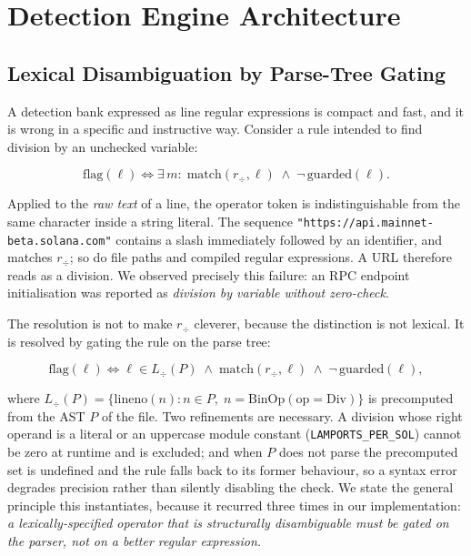 \section{Detection Engine Architecture}
\label{sec:engine}

\subsection{Lexical Disambiguation by Parse-Tree Gating}

A detection bank expressed as line regular expressions is compact and fast,
and it is wrong in a specific and instructive way. Consider a rule intended to
find division by an unchecked variable:

\begin{equation}
\mathrm{flag}(\ell) \iff \exists\, m:\; \mathrm{match}(r_{\div}, \ell)
\;\wedge\; \neg\,\mathrm{guarded}(\ell).
\label{eq:rawflag}
\end{equation}

Applied to the \emph{raw text} of a line, the operator token is
indistinguishable from the same character inside a string literal. The
sequence \texttt{"https://api.mainnet-beta.solana.com"} contains a slash
immediately followed by an identifier, and matches $r_{\div}$; so do file paths
and compiled regular expressions. A URL therefore reads as a division. We
observed precisely this failure: an RPC endpoint initialisation was reported as
\emph{division by variable without zero-check}.

The resolution is not to make $r_{\div}$ cleverer, because the distinction is
not lexical. It is resolved by gating the rule on the parse tree:

\begin{equation}
\mathrm{flag}(\ell) \iff \ell \in L_{\div}(P) \;\wedge\;
\mathrm{match}(r_{\div},\ell) \;\wedge\; \neg\,\mathrm{guarded}(\ell),
\label{eq:gated}
\end{equation}

where $L_{\div}(P) = \{\mathrm{lineno}(n) : n \in P,\;
n = \mathrm{BinOp}(\mathrm{op} = \mathrm{Div})\}$ is precomputed from the AST
$P$ of the file. Two refinements are necessary. A division whose right operand
is a literal or an uppercase module constant
(\texttt{LAMPORTS\_PER\_SOL}) cannot be zero at runtime and is excluded;
and when $P$ does not parse the precomputed set is undefined and the rule
falls back to its former behaviour, so a syntax error degrades precision
rather than silently disabling the check. We state the general principle this
instantiates, because it recurred three times in our implementation:
\emph{a lexically-specified operator that is structurally disambiguable must be
gated on the parser, not on a better regular expression.}

